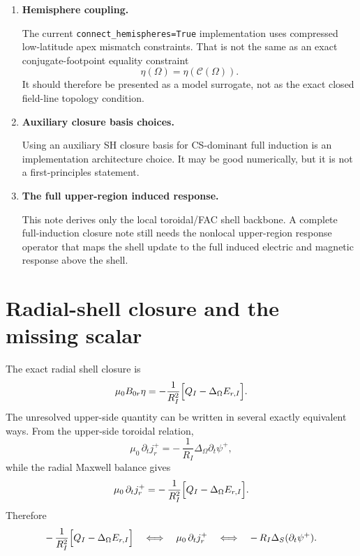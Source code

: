 \documentclass[11pt,a4paper]{article}
\begin{document}
\begin{enumerate}
\item \textbf{Hemisphere coupling.}

The current \texttt{connect\_hemispheres=True} implementation uses compressed
low-latitude apex mismatch constraints. That is not the same as an exact
conjugate-footpoint equality constraint
\[
\eta(\Omega)=\eta(\mathcal C(\Omega)).
\]
It should therefore be presented as a model surrogate, not as the exact closed
field-line topology condition.

\item \textbf{Auxiliary closure basis choices.}

Using an auxiliary SH closure basis for CS-dominant full induction is an
implementation architecture choice. It may be good numerically, but it is not a
first-principles statement.

\item \textbf{The full upper-region induced response.}

This note derives only the local toroidal/FAC shell backbone. A complete
full-induction closure note still needs the nonlocal upper-region response
operator that maps the shell update to the full induced electric and magnetic
response above the shell.
\end{enumerate}

\section{Radial-shell closure and the missing scalar}

The exact radial shell closure is
\begin{equation}
\mu_0 B_{0r}\eta
=
-\frac{1}{R_I^2}\Bigl[Q_I - \Delta_\Omega E_{r,I}\Bigr].
\label{eq:radial_shell_balance_repeat}
\end{equation}
The unresolved upper-side quantity can be written in several exactly
equivalent ways. From the upper-side toroidal relation,
\begin{equation}
\mu_0\,\partial_t j_r^+
=
-\,\frac{1}{R_I}\Delta_\Omega \partial_t\psi^+,
\label{eq:dtjr_dtpsi_upper}
\end{equation}
while the radial Maxwell balance gives
\begin{equation}
\mu_0\,\partial_t j_r^+
=
-\,\frac{1}{R_I^2}\Bigl[Q_I - \Delta_\Omega E_{r,I}\Bigr].
\label{eq:dtjr_electric_upper}
\end{equation}
Therefore
\begin{equation}
-\,\frac{1}{R_I^2}\Bigl[Q_I - \Delta_\Omega E_{r,I}\Bigr]
\quad\Longleftrightarrow\quad
\mu_0\,\partial_t j_r^+
\quad\Longleftrightarrow\quad
-\,R_I \Delta_S(\partial_t\psi^+).
\label{eq:missing_scalar_equivalence}
\end{equation}
\end{document}
